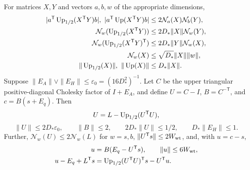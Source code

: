 \begin{lemma}\label{u:lem:dyadic}
For matrices $X,Y$ and vectors $a,b,w$ of the appropriate dimensions,
\begin{equation}\label{u:eq:dyadic-estimates}
\begin{aligned}
 |a^{\mathsf T}\Upt(X^{\mathsf T}Y)b|,\ 
 |a^{\mathsf T}\Up(X^{\mathsf T}Y)b|
 &\le2\mathcal N_a(X)\mathcal N_b(Y),\\
 \mathcal N_w(\Upt(X^{\mathsf T}Y))
 &\le2D_*\|X\|\mathcal N_w(Y),\\
 \mathcal N_w(\Upt(X^{\mathsf T}Y)^{\mathsf T})
 &\le2D_*\|Y\|\mathcal N_w(X),\\
 \mathcal N_w(X)&\le\sqrt{D_*}\|X\|\|w\|,\\
 \|\Upt(X)\|,\ \|\Up(X)\|&\le D_*\|X\|.
\end{aligned}
\end{equation}
Suppose $\|E_A\|\vee\|E_H\|\le\varepsilon_0=(16D_*^2)^{-1}$. Let $C$ be the upper triangular positive-diagonal Cholesky factor of $I+E_A$, and define $U=C-I$, $B=C^{-\mathsf T}$, and $c=B(s+E_q)$. Then
\begin{equation}\label{u:eq:cholesky-equation}
 U=L-\operatorname{Up}_{1/2}(U^{\mathsf T}U),
\end{equation}
\begin{equation}\label{u:eq:cholesky-bounds}
 \|U\|\le2D_*\varepsilon_0,\qquad \|B\|\le2,\qquad
 2D_*\|U\|\le1/2,\qquad D_*\|E_H\|\le1.
\end{equation}
Further, $\mathcal N_w(U)\le2\mathcal N_w(L)$ for $w=s,b$, $\|U^{\mathsf T}s\|\le2W_{\rm wt}$, and, with $u=c-s$,
\begin{equation}\label{u:eq:coefficient-remainder}
\begin{aligned}
 u&=B(E_q-U^{\mathsf T}s),\qquad \|u\|\le6W_{\rm wt},\\
 u-E_q+L^{\mathsf T}s
 &=\operatorname{Up}_{1/2}(U^{\mathsf T}U)^{\mathsf T}s-U^{\mathsf T}u.
\end{aligned}
\end{equation}
\end{lemma}

